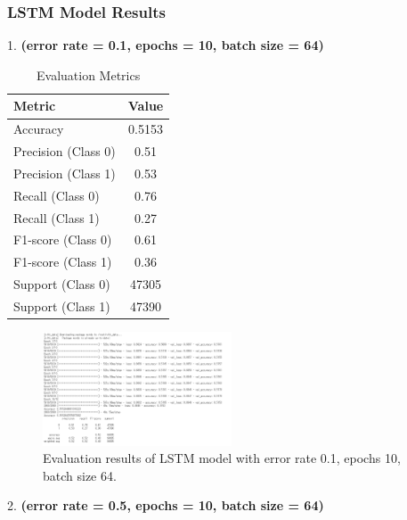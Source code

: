 \subsubsection{LSTM Model Results}

1. \textbf{(error rate = 0.1, epochs = 10, batch size = 64)}

\begin{table}[h!]
\centering
\caption{Evaluation Metrics}
\label{tab:evaluation_metrics}
\begin{tabular}{|l|c|}
\hline
\textbf{Metric} & \textbf{Value} \\
\hline
Accuracy        & 0.5153 \\
\hline
Precision (Class 0)       & 0.51 \\
\hline
Precision (Class 1)       & 0.53 \\
\hline
Recall (Class 0)       & 0.76 \\
\hline
Recall (Class 1)       & 0.27 \\
\hline
F1-score (Class 0)       & 0.61 \\
\hline
F1-score (Class 1)       & 0.36 \\
\hline
Support (Class 0)       & 47305 \\
\hline
Support (Class 1)       & 47390 \\
\hline
\end{tabular}
\end{table}

\begin{figure}[h!]
    \centering
    \includegraphics[width=0.5\textwidth]{Figures/ER10_epoch10_batch64.png}
    \caption{Evaluation results of LSTM model with error rate 0.1, epochs 10, batch size 64.}
    \label{fig:lstm_results_0.1_10_64}
\end{figure}

2. \textbf{(error rate = 0.5, epochs = 10, batch size = 64)}

